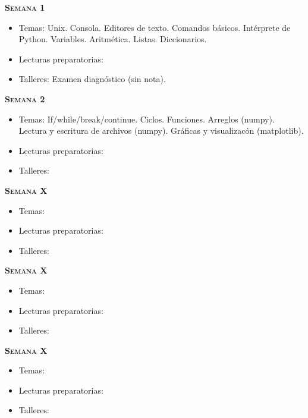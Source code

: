 \documentclass[letterpaper,10pt,onecolumn]{article}
\begin{document}
\noindent\textbf{\textsc{Semana 1}}\\[-0.5cm]
\begin{itemize}
\item Temas:
Unix. Consola. Editores de texto. Comandos b\'asicos. Int\'erprete de
Python. Variables. Aritm\'etica. Listas. Diccionarios.\\[-0.6cm]
\item Lecturas preparatorias: \\[-0.6cm]
\item Talleres: Examen diagn\'ostico (sin nota). \\[-0.6cm]
\end{itemize}

\noindent\textbf{\textsc{Semana 2}}\\[-0.5cm]
\begin{itemize}
\item Temas: If/while/break/continue. Ciclos. Funciones. Arreglos
(numpy). Lectura y escritura de archivos (numpy). Gr\'aficas y
visualizac\'on (matplotlib). \\[-0.6cm]
\item Lecturas preparatorias: \\[-0.6cm]
\item Talleres: \\[-0.6cm]
\end{itemize}

\noindent\textbf{\textsc{Semana X}}\\[-0.5cm]
\begin{itemize}
\item Temas: \\[-0.6cm]
\item Lecturas preparatorias: \\[-0.6cm]
\item Talleres: \\[-0.6cm]
\end{itemize}

\noindent\textbf{\textsc{Semana X}}\\[-0.5cm]
\begin{itemize}
\item Temas: \\[-0.6cm]
\item Lecturas preparatorias: \\[-0.6cm]
\item Talleres: \\[-0.6cm]
\end{itemize}

\noindent\textbf{\textsc{Semana X}}\\[-0.5cm]
\begin{itemize}
\item Temas: \\[-0.6cm]
\item Lecturas preparatorias: \\[-0.6cm]
\item Talleres: \\[-0.6cm]
\end{itemize}
\end{document}
